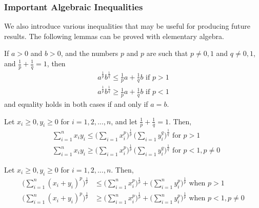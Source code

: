 \documentclass{article}
\begin{document}
    \subsubsection{Important Algebraic Inequalities}

    We also introduce various inequalities that may be useful for producing future results. The following lemmas can be proved with elementary algebra. 

    \begin{lemma}
      If $a>0$ and $b>0$, and the numbers $p$ and $p$ are such that $p \neq 0, 1$ and $q \neq 0, 1$, and $\frac{1}{p} + \frac{1}{q} = 1$, then 
      \begin{align*}
          a^{\frac{1}{p}} b^{\frac{1}{q}} \leq \frac{1}{p} a + \frac{1}{q} b \text{  if } p > 1 \\
          a^{\frac{1}{p}} b^{\frac{1}{q}} \geq \frac{1}{p} a + \frac{1}{q} b \text{  if } p < 1
      \end{align*}
      and equality holds in both cases if and only if $a = b$. 
    \end{lemma}

    \begin{lemma}
      Let $x_i \geq 0, y_i \geq 0$ for $i = 1, 2, ..., n$, and let $\frac{1}{p} + \frac{1}{q} = 1$. Then, 
      \begin{align*}
          &\sum_{i=1}^n x_i y_i \leq \bigg( \sum_{i=1} x_i^p \bigg)^{\frac{1}{p}} \, \bigg( \sum_{i=1} y_i^q \bigg)^{\frac{1}{q}} \text{  for } p > 1 \\
          &\sum_{i=1}^n x_i y_i \geq \bigg( \sum_{i=1} x_i^p \bigg)^{\frac{1}{p}} \, \bigg( \sum_{i=1} y_i^q \bigg)^{\frac{1}{q}} \text{  for } p < 1, p \neq 0
      \end{align*}
    \end{lemma}

    \begin{lemma}
      Let $x_i \geq 0, y_i \geq 0$ for $i = 1, 2, ... ,n$. Then, 
      \begin{align*}
          \bigg( \sum_{i=1}^n (x_i + y_i)^p \bigg)^{\frac{1}{p}} & \leq \bigg( \sum_{i=1}^n x_i^p \bigg)^\frac{1}{p} + \bigg( \sum_{i=1}^n y_i^p \bigg)^{\frac{1}{p}} \text{  when } p > 1 \\
          \bigg( \sum_{i=1}^n (x_i + y_i)^p \bigg)^{\frac{1}{p}} & \geq \bigg( \sum_{i=1}^n x_i^p \bigg)^\frac{1}{p} + \bigg( \sum_{i=1}^n y_i^p \bigg)^{\frac{1}{p}} \text{  when } p < 1, p \neq 0
      \end{align*}
    \end{lemma}
\end{document}
